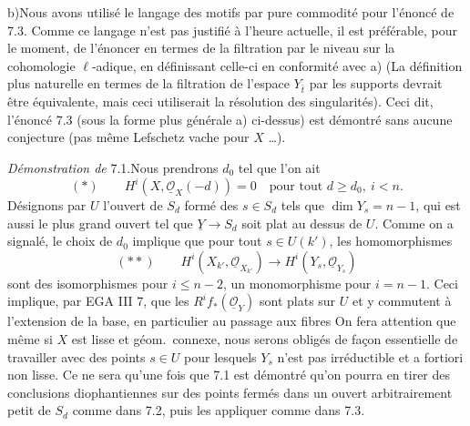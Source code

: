 \documentclass[11pt,a4paper]{article}
\begin{document}
b)\quad Nous avons utilisé le langage des motifs par pure commodité pour
l'énoncé de 7.3. Comme ce langage n'est pas justifié à l'heure actuelle, il est
préférable, pour le moment, de l'énoncer en termes de la filtration par le
niveau sur la cohomologie $\ell$-adique, en définissant celle-ci en conformité
avec a) (La définition plus naturelle en termes de la filtration de l'espace
$Y_{\bar t}$ par les supports devrait être équivalente, mais ceci utiliserait
la résolution des singularités). Ceci dit, l'énoncé 7.3 (sous la forme plus
générale a) ci-dessus) est démontré sans aucune conjecture (pas même Lefschetz
vache pour $X$ \ldots).



\emph{Démonstration de} 7.1.\quad Nous prendrons  $d_0$
 tel que l'on ait 
\[
(*) \qquad H^i(X, \underline{\mathcal{O}}_X(-d)) = 0
\quad \text{pour tout } d \geqslant d_0,\ i < n.
\]
Désignons par $U$ l'ouvert de $S_d$ formé des $s \in S_d$ tels que $\dim Y_s =
n-1$, qui est aussi le plus grand ouvert tel que $\underline{Y} \to S_d$ soit
plat au dessus de $U$. Comme on a signalé, le choix de $d_0$ implique que pour
tout $s \in U(k')$, les homomorphismes
\[
(**) \qquad H^i(X_{k'}, \underline{\mathcal{O}}_{X_{k'}}) \longrightarrow
H^i(Y_s, \underline{\mathcal{O}}_{Y_s})
\]
sont des isomorphismes pour $i \leqslant n-2$, un monomorphisme pour $i = n-1$.
Ceci implique, par EGA III 7, que les $R^i f_{*}(\underline{\mathcal{O}}_Y)$ sont
plats sur $U$ et y commutent à l'extension de la base, en particulier au passage
aux fibres On fera attention que même si $X$ est lisse et géom.\ connexe,
nous serons obligés de façon essentielle de travailler avec des points $s \in U$
pour lesquels $Y_s$ n'est pas irréductible et a fortiori non lisse. Ce ne sera
qu'une fois que 7.1 est démontré qu'on pourra en tirer des conclusions
diophantiennes sur des points fermés dans un ouvert arbitrairement petit de $S_d$
comme dans 7.2, puis les appliquer comme dans 7.3.
\end{document}
